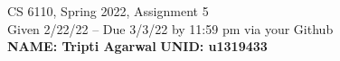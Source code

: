 \documentclass[11pt]{article}
\begin{document}

\newlength{\minpagw}
\settowidth{\minpagw}{\hspace{40em}}

\begin{center}
\begin{large}
  CS 6110, Spring 2022, Assignment 5  \\
  Given 2/22/22 -- Due 3/3/22 by 11:59 pm via your Github 
  \ \\
    {  {\Large\bf NAME: Tripti Agarwal} \hfill {\Large\bf UNID: u1319433}\hspace{4cm} }
          \ \\
\end{large}

\end{center}
\end{document}
